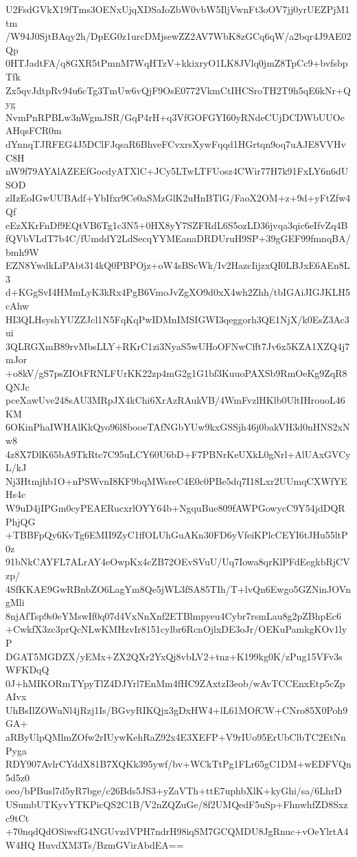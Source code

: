 U2FsdGVkX19fTms3OENxUjqXDSaIoZbW0vbW5IljVwnFt3oOV7jj0yrUEZPjM1tm
/W94J0SjtBAqy2h/DpEG0z1urcDMjsewZZ2AV7WbK8zGCq6qW/a2bqr4J9AE02Qp
0HTJadtFA/q8GXR5tPmnM7WqHTzV+kkixryO1LK8JVlq0jmZ8TpCc9+bvfsbpTfk
Zx5qvJdtpRv94u6cTg3TmUw6vQjF9OsE0772VkmCtIHCSroTH2T9h5qE6kNr+Qyg
NvmPnRPBLw3nWgmJSR/GqP4rH+q3VfGOFGYI60yRNdeCUjDCDWbUUOeAHqsFCR0m
dYnnqTJRFEG4J5DClFJqsaR6BhveFCvxrsXywFqqd1HGrtqn9oq7uAJE8VVHvC8H
nW9f79AYAlAZEEfGocdyATXlC+JCy5LTwLTFUosz4CWir77H7k91FxLY6n6dUSOD
zlIzEoIGwUUBAdf+YbIfxr9Ce0aSMzGlK2uHnBTlG/FaoX2OM+z+9d+yFtZfw4Qf
eEzXKrFnDf9EQtVB6Tg1c3N5+0HX8yY7SZFRdL6S5ozLD36jvqa3qic6eIfvZq4B
fQVbVLdT7b4C/fUmddY2LdSecqYYMEanaDRDUruH9SP+39gGEF99fmnqBA/bmh9W
EZN8YwdkLiPAbt314kQ0PBPOjz+oW4sBScWk/Iv2HazcIijzxQI0LBJxE6AEn8L3
d+KGgSvI4HMmLyK3kRx4PgB6VmoJvZgXO9d0xX4wh2Zhh/tbIGAiJIGJKLH5cAhw
HI3QLHsyshYUZZJcl1N5FqKqPwIDMnIMSIGWI3qeggorh3QE1NjX/k0EsZ3Ac3ui
3QLRGXmB89rvMbsLLY+RKrC1zi3NyaS5wUHoOFNwCfft7Jv6x5KZA1XZQ4j7mJor
+o8kV/gS7psZIOtFRNLFUrKK22zp4mG2g1G1bf3KuuoPAXSb9RmOeKg9ZqR8QNJc
pceXawUve248sAU3MRpJX4kChi6XrAzRAukVB/4WmFvzlHKlb0UltIHrouoL46KM
6OKinPhaIWHAlKkQyo96l8booeTAfNGbYUw9kxGSSjh46j0bakVH3d0nHNS2xNw8
4z8X7DlK65bA9TkRtc7C95uLCY60U6bD+F7PBNrKeUXkL0gNrl+AlUAxGVCyL/kJ
Nj3Htmjhb1O+nPSWvnI8KF9bqMWsreC4E0c0PBe5dq7I18Lxr2UUmqCXWfYEHs4c
W9uD4jIPGm0cyPEAERucxrlOYY64b+NgquBue809fAWPGowycC9Y54jdDQRPhjQG
+TBBFpQy6KvTg6EMII9ZyC1ffOLUhGuAKn30FD6yVfeiKPlcCEYI6tJHu55ltP0z
91bNkCAYFL7ALrAY4eOwpKx4cZB72OEvSVuU/Uq7Iowa8qrKlPFdEegkbRjCVzp/
4SfKKAE9GwRBnbZO6LagYm8Qe5jWL3fSA85TIh/T+lvQn6Ewgo5GZNinJOVngMli
8njAfTsp9s0eYMswIf0q07d4VxNnXnf2ETBlmpyeu4Cybr7rsmLau8g2pZBhpEc6
+CwkfX3zc3prQcNLwKMHzvIr8151cylbr6RcnOjlxDE3oJr/OEKuPamkgKOv1lyP
DGAT5MGDZX/yEMx+ZX2QXr2YxQj8vbLV2+tnz+K199kg0K/zPug15VFv3sWFKDqQ
0J+hMIKORmTYpyTlZ4DJYrl7EnMm4fHC9ZAxtzI3eob/wAvTCCEnxEtp5cZpAIvx
UhBsIlZOWuNl4jRzj1Is/BGvyRIKQjx3gDxHW4+lL61MOfCW+CNro85X0Poh9GA+
aRByUlpQMlmZOfw2rIUywKehRaZ92x4E3XEFP+V9rIUo95ErUbClbTC2EtNnPyga
RDY907AvlrCYddX81B7XQKk395ywf/bv+WCkTtPg1FLr65gC1DM+wEDFVQn5d5z0
oeo/bPBusl7d5yR7bge/c26Bds5JS3+yZaVTh+ttE7uphbXlK+kyGhi/sa/6LhrD
USumbUTKyvYTKPicQS2C1B/V2nZQZuGe/8f2UMQedF5uSp+FhnwhfZD8Sxzc9tCt
+70nqdQdOSiwsfG4NGUvzdVPH7ndrH98iqSM7GCQMDU8JgRnuc+vOeYlrtA4W4HQ
HuvdXM3Ts/BzmGVirAbdEA==
